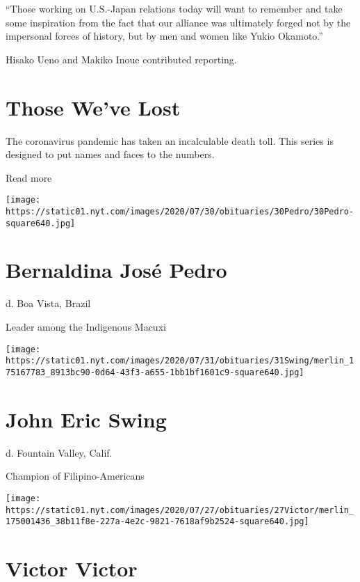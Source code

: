 ``Those working on U.S.-Japan relations today will want to remember and
take some inspiration from the fact that our alliance was ultimately
forged not by the impersonal forces of history, but by men and women
like Yukio Okamoto.''

Hisako Ueno and Makiko Inoue contributed reporting.

\href{https://www.nytimes.com/interactive/2020/obituaries/people-died-coronavirus-obituaries.html?action=click\&pgtype=Article\&state=default\&region=BELOW_MAIN_CONTENT\&context=covid_obits_promo}{}

\hypertarget{those-weve-lost}{%
\section{Those We've Lost}\label{those-weve-lost}}

The coronavirus pandemic has taken an incalculable death toll. This
series is designed to put names and faces to the numbers.

Read more

\texttt{[image: https://static01.nyt.com/images/2020/07/30/obituaries/30Pedro/30Pedro-square640.jpg]}

\hypertarget{bernaldina-josuxe9-pedro}{%
\section{Bernaldina José Pedro}\label{bernaldina-josuxe9-pedro}}

d. Boa Vista, Brazil

Leader among the Indigenous Macuxi

\texttt{[image: https://static01.nyt.com/images/2020/07/31/obituaries/31Swing/merlin\_175167783\_8913bc90-0d64-43f3-a655-1bb1bf1601c9-square640.jpg]}

\hypertarget{john-eric-swing}{%
\section{John Eric Swing}\label{john-eric-swing}}

d. Fountain Valley, Calif.

Champion of Filipino-Americans

\texttt{[image: https://static01.nyt.com/images/2020/07/27/obituaries/27Victor/merlin\_175001436\_38b11f8e-227a-4e2c-9821-7618af9b2524-square640.jpg]}

\hypertarget{victor-victor}{%
\section{Victor Victor}\label{victor-victor}}


